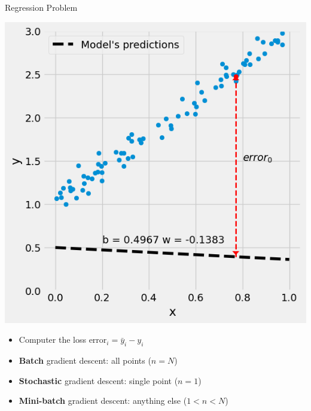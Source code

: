 \documentclass[pdflatex,compress,mathserif]{beamer}
\begin{document}
\begin{frame}{Regression Problem}
	\begin{multicols}{2}
		\begin{center}
			\includegraphics[width=\linewidth]{img/04}
		\end{center}
		\columnbreak
		\begin{itemize}
			\item Computer the loss $\text{error}_i = \bar{y}_i - y_i$
			\item \textbf{Batch} gradient descent: all points ($n = N$)
			\item \textbf{Stochastic} gradient descent: single point ($n = 1$)
			\item \textbf{Mini-batch} gradient descent: anything else ($1 < n < N$)
		\end{itemize}
	\end{multicols}
\end{frame}
\end{document}
